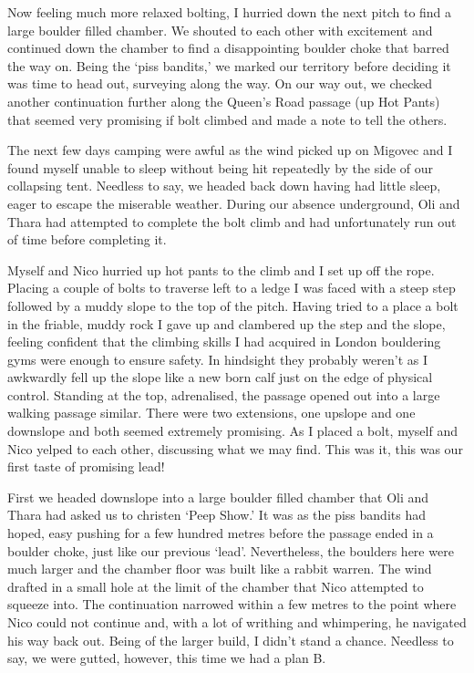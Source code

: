 Now feeling much more relaxed bolting, I hurried down the next pitch to
find a large boulder filled chamber. We shouted to each other with
excitement and continued down the chamber to find a disappointing
boulder choke that barred the way on. Being the `piss bandits,' we
marked our territory before deciding it was time to head out, surveying
along the way. On our way out, we checked another continuation further
along the Queen's Road passage (up Hot Pants) that seemed very promising
if bolt climbed and made a note to tell the others.

The next few days camping were awful as the wind picked up on Migovec
and I found myself unable to sleep without being hit repeatedly by the
side of our collapsing tent. Needless to say, we headed back down having
had little sleep, eager to escape the miserable weather. During our
absence underground, Oli and Thara had attempted to complete the bolt
climb and had unfortunately run out of time before completing it.

Myself and Nico hurried up hot pants to the climb and I set up off the
rope. Placing a couple of bolts to traverse left to a ledge I was faced
with a steep step followed by a muddy slope to the top of the pitch.
Having tried to a place a bolt in the friable, muddy rock I gave up and
clambered up the step and the slope, feeling confident that the climbing
skills I had acquired in London bouldering gyms were enough to ensure
safety. In hindsight they probably weren't as I awkwardly fell up the
slope like a new born calf just on the edge of physical control.
Standing at the top, adrenalised, the passage opened out into a large
walking passage similar. There were two extensions, one upslope and one
downslope and both seemed extremely promising. As I placed a bolt,
myself and Nico yelped to each other, discussing what we may find. This
was it, this was our first taste of promising lead!

First we headed downslope into a large boulder filled chamber that Oli
and Thara had asked us to christen `Peep Show.' It was as the piss
bandits had hoped, easy pushing for a few hundred metres before the
passage ended in a boulder choke, just like our previous `lead'.
Nevertheless, the boulders here were much larger and the chamber floor
was built like a rabbit warren. The wind drafted in a small hole at the
limit of the chamber that Nico attempted to squeeze into. The
continuation narrowed within a few metres to the point where Nico could
not continue and, with a lot of writhing and whimpering, he navigated
his way back out. Being of the larger build, I didn't stand a chance.
Needless to say, we were gutted, however, this time we had a plan B.

